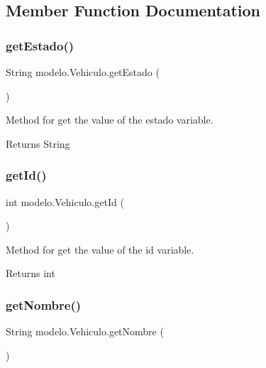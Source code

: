\subsection{Member Function Documentation}
\mbox{\label{classmodelo_1_1_vehiculo_afc2b35fba98cc54bd67dd922db3bdc5e}} 
\subsubsection{\texorpdfstring{get\+Estado()}{getEstado()}}
{\footnotesize\ttfamily String modelo.\+Vehiculo.\+get\+Estado (\begin{DoxyParamCaption}{ }\end{DoxyParamCaption})}



Method for get the value of the estado variable. 

\begin{DoxyReturn}{Returns}
String 
\end{DoxyReturn}
\mbox{\label{classmodelo_1_1_vehiculo_ac147041ca1529b3f926a16f67aeacbd7}} 
\subsubsection{\texorpdfstring{get\+Id()}{getId()}}
{\footnotesize\ttfamily int modelo.\+Vehiculo.\+get\+Id (\begin{DoxyParamCaption}{ }\end{DoxyParamCaption})}



Method for get the value of the id variable. 

\begin{DoxyReturn}{Returns}
int 
\end{DoxyReturn}
\mbox{\label{classmodelo_1_1_vehiculo_ac3ccc12d49158c7c20b4b9c8bb7dce85}} 
\subsubsection{\texorpdfstring{get\+Nombre()}{getNombre()}}
{\footnotesize\ttfamily String modelo.\+Vehiculo.\+get\+Nombre (\begin{DoxyParamCaption}{ }\end{DoxyParamCaption})}



